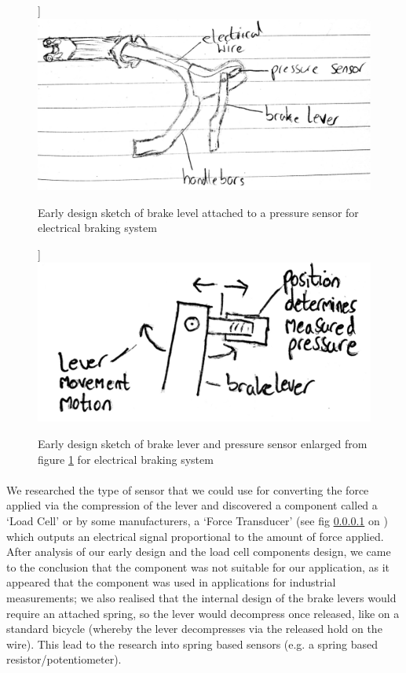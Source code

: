 \documentclass[a4paper]{report}
\begin{document}
\begin{figure}[!htb]]
\centering
\includegraphics[scale=0.55]{figures/early_sketches/braking_system/brake_lever_pressure_switch}
\caption{Early design sketch of brake level attached to a pressure sensor for electrical braking system}
\label{fig:early_brake_level_pressure}
\end{figure}

\begin{figure}[!htb]]
\centering
\includegraphics[scale=0.25]{figures/early_sketches/braking_system/brake_lever_pressure_sensor_enlarged}
\caption{Early design sketch of brake lever and pressure sensor enlarged from figure \ref{fig:early_brake_level_pressure} for electrical braking system}
\label{fig:early_brake_level_pressure_enlarged}
\end{figure}

\paragraph{}We researched the type of sensor that we could use for converting the force applied via the compression of the lever and discovered a component called a `Load Cell' or by some manufacturers, a `Force Transducer' (see fig \ref{}  on \pageref{}) which outputs an electrical signal proportional to the amount of force applied. 
After analysis of our early design and the load cell components design, we came to the conclusion that the component was not suitable for our application, as it appeared that the component was used in applications for industrial measurements; we also realised that the internal design of the brake levers would require an attached spring, so the lever would decompress once released, like on a standard bicycle (whereby the lever decompresses via the released hold on the wire). This lead to the research into spring based sensors (e.g. a spring based resistor/potentiometer). 
\end{document}

